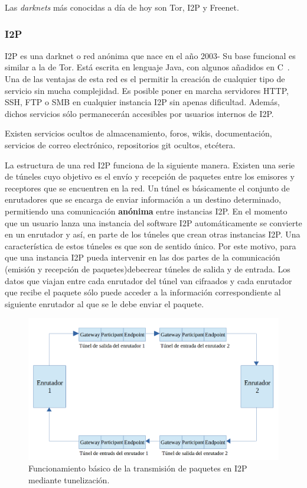 Las \textit{darknets} más conocidas a día de hoy son Tor, I2P y Freenet.

\subsubsection {I2P}

I2P es una darknet o red anónima que nace en el año 2003- Su base funcional es similar a la de Tor. Está escrita en lenguaje Java, con algunos añadidos en C~\cite{article:i2p}.
Una de las ventajas de esta red es el permitir la creación de cualquier tipo de servicio sin mucha complejidad. Es posible poner en marcha servidores HTTP, SSH, FTP o SMB en cualquier instancia I2P sin apenas dificultad. Además, dichos servicios sólo permanecerán accesibles por usuarios internos de I2P.

Existen servicios ocultos de almacenamiento, foros, wikis, documentación, servicios de correo electrónico, repositorios git ocultos, etcétera.

La estructura de una red I2P funciona de la siguiente manera.
Existen una serie de túneles cuyo objetivo es el envío y recepción de paquetes entre los emisores y receptores que se encuentren en la red. Un túnel es básicamente el conjunto de enrutadores que se encarga de enviar información a un destino determinado, permitiendo una comunicación \textbf{anónima} entre instancias I2P.
En el momento que un usuario lanza una instancia del software I2P automáticamente se convierte en un enrutador y así, en parte de los túneles que crean otras instancias I2P.
Una característica de estos túneles es que son de sentido único. Por este motivo, para que una instancia I2P pueda intervenir en las dos partes de la comunicación (emisión y recepción de paquetes)debecrear túneles de salida y de entrada. Los datos que viajan entre cada enrutador del túnel van cifraados y cada enrutador que recibe el paquete sólo puede acceder a la información correspondiente al siguiente enrutador al que se le debe enviar el paquete.

	\begin{figure}[h]
		\centerline{
			\mbox{\includegraphics[width=5.00in]{images/tunnel_i2p.png}}
		}
		\caption{Funcionamiento básico de la transmisión de paquetes en I2P mediante tunelización.}
		\label{fig:I2PTunneling}
	\end{figure}




